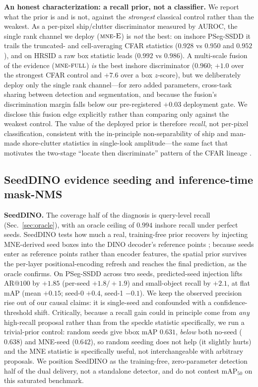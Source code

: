 \textbf{An honest characterization: a recall prior, not a classifier.} We report what the prior is and is not, against the \emph{strongest} classical control rather than the weakest. As a per-pixel ship/clutter discriminator measured by AUROC, the single rank channel we deploy ($\textsc{mne-E}$) is \emph{not} the best: on inshore PSeg-SSDD it trails the truncated- and cell-averaging CFAR statistics ($0.928$ vs $0.950$ and $0.952$), and on HRSID a raw box statistic leads ($0.992$ vs $0.986$). A multi-scale fusion of the evidence ($\textsc{mne-full}$) \emph{is} the best inshore discriminator ($0.960$; $+1.0$ over the strongest CFAR control and $+7.6$ over a box $z$-score), but we deliberately deploy only the single rank channel---for zero added parameters, cross-task sharing between detection and segmentation, and because the fusion's discrimination margin falls below our pre-registered $+0.03$ deployment gate. We disclose this fusion edge explicitly rather than comparing only against the weakest control. The value of the deployed prior is therefore \emph{recall}, not per-pixel classification, consistent with the in-principle non-separability of ship and man-made shore-clutter statistics in single-look amplitude---the same fact that motivates the two-stage ``locate then discriminate'' pattern of the CFAR lineage \cite{finn1968cfar}.

\subsection{SeedDINO evidence seeding and inference-time mask-NMS}
\label{sec:seeddino}
\textbf{SeedDINO.} The coverage half of the diagnosis is query-level recall (Sec.~\ref{sec:oracle}), with an oracle ceiling of $0.994$ inshore recall under perfect seeds. SeedDINO tests how much a real, training-free prior recovers by injecting MNE-derived seed boxes into the DINO decoder's reference points \cite{zhang2023dino}; because seeds enter as reference points rather than encoder features, the spatial prior survives the per-layer positional-encoding refresh and reaches the final prediction, as the oracle confirms. On PSeg-SSDD across two seeds, predicted-seed injection lifts AR@$100$ by $+1.85$ (per-seed $+1.8/+1.9$) and small-object recall by $+2.1$, at flat mAP (mean $+0.15$; seed-0 $+0.4$, seed-1 $-0.1$). We keep the observed precision rise out of our causal claims: it is single-seed and confounded with a confidence-threshold shift. Critically, because a recall gain could in principle come from \emph{any} high-recall proposal rather than from the speckle statistic specifically, we run a trivial-prior control: random seeds give bbox mAP $0.631$, \emph{below} both no-seed ($0.638$) and MNE-seed ($0.642$), so random seeding does not help (it slightly hurts) and the MNE statistic is specifically useful, not interchangeable with arbitrary proposals. We position SeedDINO as the training-free, zero-parameter detection half of the dual delivery, not a standalone detector, and do not contest mAP$_{50}$ on this saturated benchmark.

